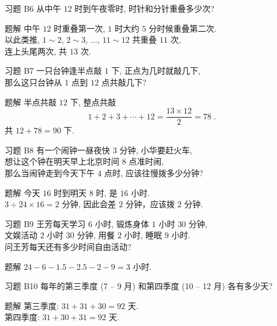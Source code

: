 \documentclass[content.tex]{subfiles}
\begin{document}
\begin{frame}{习题 B6}
从中午 $12$ 时到午夜零时, 时针和分针重叠多少次?
\begin{exampleblock}{题解}
中午 $12$ 时重叠第一次, $1$ 时大约 $5$ 分时候重叠第二次. \\
以此类推, $1 \sim 2$, \quad $2 \sim 3$, \quad $\ldots$, \quad $11\sim 12$ 
共重叠 $11$ 次, \\
连上头尾两次, 共 $13$ 次.
\end{exampleblock}
\end{frame}

\begin{frame}{习题 B7}
一只台钟逢半点敲 $1$ 下, 正点为几时就敲几下, \\
那么这只台钟从 $1$ 点到 $12$ 点共敲几下? \\
\begin{exampleblock}{题解}
半点共敲 $12$ 下, 整点共敲 
$$1+2+3+\cdots+12=\frac{13\times 12}{2}=78\;.$$
共 $12+78=90$ 下.
\end{exampleblock}
\end{frame}

\begin{frame}{习题 B8}
有一个闹钟一昼夜快 $3$ 分钟, 小华要赶火车, \\
想让这个钟在明天早上北京时间 $8$ 点准时闹, \\
那么当闹钟走到今天下午 $4$ 点时, 应该往慢拨多少分钟?
\begin{exampleblock}{题解}
今天 $16$ 时到明天 $8$ 时, 是 $16$ 小时. \\
$3\div 24\times 16=2$ 分钟, 因此会差 $2$ 分钟，应该拨 $2$ 分钟.
\end{exampleblock}
\end{frame}

\begin{frame}{习题 B9}
王芳每天学习 $6$ 小时, 锻炼身体 $1$ 小时 $30$ 分钟, \\
文娱活动 $2$ 小时 $30$ 分钟, 用餐 $2$ 小时, 睡眠 $9$ 小时. \\
问王芳每天还有多少时间自由活动?
\begin{exampleblock}{题解}
$24-6-1.5-2.5-2-9=3$ 小时.
\end{exampleblock}
\end{frame}

\begin{frame}{习题 B10}
每年的第三季度 (7 -- 9 月) 和第四季度 (10 -- 12 月) 各有多少天?
\begin{exampleblock}{题解}
第三季度: $31+31+30 = 92$ 天. \\
第四季度: $31+30+31 = 92$ 天. \\
\end{exampleblock}
\end{frame}
\end{document}
